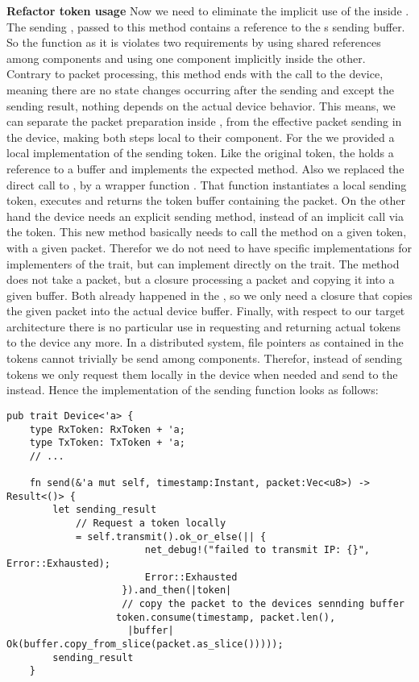 \textbf{Refactor token usage}
Now we need to eliminate the implicit use of the \dev{} inside . The sending , passed to this method contains a reference to the \dev{}s sending buffer. So the function as it is violates two requirements by using shared references among components and using one component implicitly inside the other.
Contrary to packet processing, this method ends with the call to the device, meaning there are no state changes occurring after the sending and except the sending result, nothing depends on the actual device behavior. This means, we can separate the packet preparation inside , from the effective packet sending in the device, making both steps local to their component. For the \stack{} we provided a local implementation of the sending token. Like the original token, the  holds a reference to a buffer and implements the expected  method. Also we replaced the direct call to , by a wrapper function . That function instantiates a local sending token, executes  and returns the token buffer
containing the packet. On the other hand the device needs an explicit sending method, instead of an implicit call via the token. This new  method basically needs to call the  method on a given token, with a given packet. Therefor we do not need to have specific implementations for implementers of the  trait, but can implement  directly on the trait. The method  does not take a packet, but a closure processing a packet and copying it into a given buffer. Both already happened in the \stack, so we only need a closure that copies the given packet into the actual device buffer. Finally, with respect to our target architecture there is no particular use in requesting and returning actual tokens to the device any more. In a distributed system, file pointers as contained in the tokens cannot trivially be send among components. Therefor, instead of sending tokens we only request them locally in the device when needed and send  to the \stack{} instead. Hence the implementation of the sending function looks as follows:

\begin{verbatim}
pub trait Device<'a> {
    type RxToken: RxToken + 'a;
    type TxToken: TxToken + 'a;
    // ... 
    
    fn send(&'a mut self, timestamp:Instant, packet:Vec<u8>) -> Result<()> {
        let sending_result
            // Request a token locally
            = self.transmit().ok_or_else(|| {
                        net_debug!("failed to transmit IP: {}", Error::Exhausted);
                        Error::Exhausted
                    }).and_then(|token|
                    // copy the packet to the devices sennding buffer
                   token.consume(timestamp, packet.len(),
                     |buffer| Ok(buffer.copy_from_slice(packet.as_slice()))));
        sending_result
    }                 
\end{verbatim}

